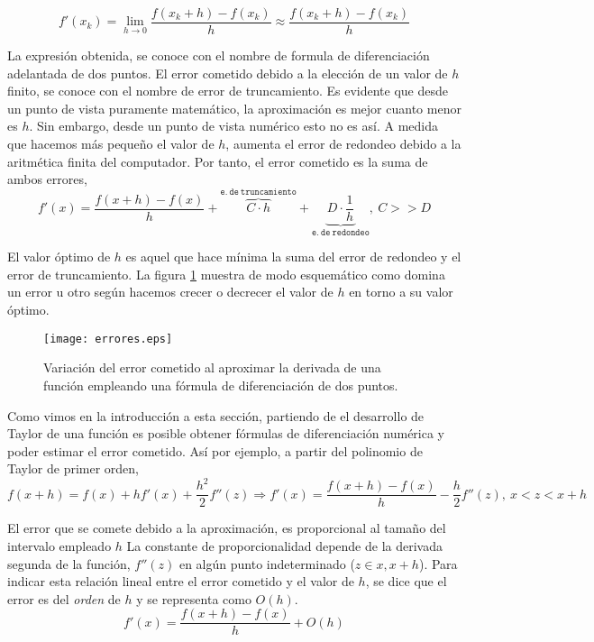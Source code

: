 \begin{equation*}
f'(x_k)=\lim_{h\rightarrow 0}\frac{f(x_k+h)-f(x_k)}{h} \approx \frac{f(x_k+h)-f(x_k)}{h} 
\end{equation*}

La expresión obtenida, se conoce con el nombre de formula de diferenciación adelantada de dos puntos. El error cometido debido a la elección de un valor de $h$ finito, se conoce con el nombre de error de truncamiento. Es evidente que desde un punto de vista puramente matemático, la aproximación es mejor cuanto menor es $h$. Sin embargo, desde un punto de vista numérico esto no es así. A medida que hacemos más pequeño el valor de $h$, aumenta el error de redondeo debido a la aritmética finita del computador. Por tanto, el error cometido es la suma de ambos errores,
\begin{equation*}
f'(x)=\frac{f(x+h)-f(x)}{h}+\overbrace{C\cdot h}^{\mathtt{e.\ de\  truncamiento}}+\underbrace{D\cdot \frac{1}{h}}_{\mathtt{e.\ de\  redondeo}}, \ C>>D 
\end{equation*}

El valor óptimo de $h$ es aquel que hace mínima la suma del error de redondeo y el error de truncamiento. La figura \ref{fig:errores} muestra de modo esquemático como domina un error u otro según hacemos crecer o decrecer el valor de $h$ en torno a su valor óptimo.

\begin{figure}[h]
\centering
\texttt{[image: errores.eps]}
\caption{Variación del error cometido al aproximar la derivada de una función empleando una fórmula de diferenciación de dos puntos.} 
\label{fig:errores}
\end{figure}

Como vimos en la introducción a esta sección, partiendo de el desarrollo de Taylor de una función es posible obtener fórmulas de diferenciación numérica y poder estimar el error cometido. Así por ejemplo, a  partir del polinomio de Taylor de primer orden,
\begin{equation*}
f(x+h)=f(x)+hf'(x)+\frac{h^2}{2}f''(z) \Rightarrow f'(x)=\frac{f(x+h)-f(x)}{h}-\frac{h}{2}f''(z), \ x<z<x+h
\end{equation*}

El error que se comete debido a la aproximación, es proporcional al tamaño del intervalo empleado $h$ La constante de proporcionalidad depende de la derivada segunda de la función, $f''(z)$ en algún punto indeterminado ($z\in x,x+h$). Para indicar esta relación lineal entre el error cometido y el valor de $h$, se dice que el error es del \emph{orden} de $h$ y se representa como $O(h)$.
\begin{equation*}
f'(x)=\frac{f(x+h)-f(x)}{h}+O(h)
\end{equation*}

